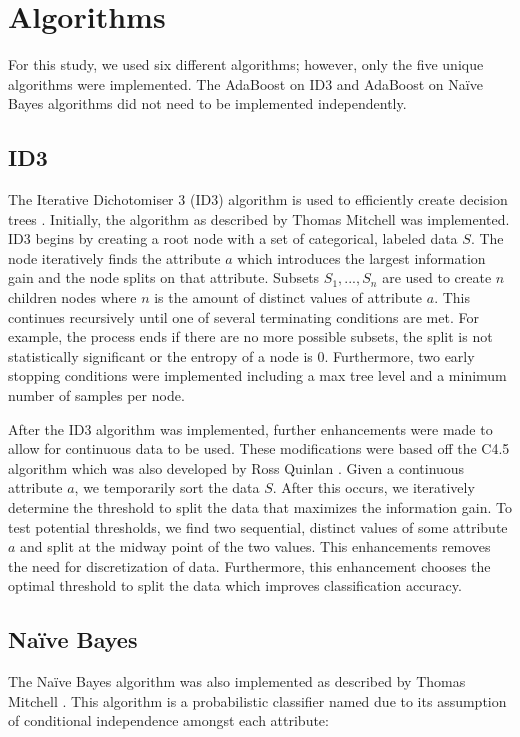 \documentclass[11pt,titlepage]{article}
\begin{document}
\section{Algorithms} \label{algorithms}
For this study, we used six different algorithms; however, only the five unique algorithms were implemented. The AdaBoost on ID3 and AdaBoost on Naïve Bayes algorithms did not need to be implemented independently.

\subsection{ID3}
The Iterative Dichotomiser 3 (ID3) algorithm is used to efficiently create decision trees \cite{Quinlan:1986:IDT:637962.637969}. Initially, the algorithm as described by Thomas Mitchell \cite{Mitchell:1997:ML:541177} was implemented. ID3 begins by creating a root node with a set of categorical, labeled data $S$. The node iteratively finds the attribute $a$ which introduces the largest information gain and the node splits on that attribute. Subsets ${S_1,...,S_n}$ are used to create $n$ children nodes where $n$ is the amount of distinct values of attribute $a$. This continues recursively until one of several terminating conditions are met. For example, the process ends if there are no more possible subsets, the split is not statistically significant or the entropy of a node is $0$. Furthermore, two early stopping conditions were implemented including a max tree level and a minimum number of samples per node.

After the ID3 algorithm was implemented, further enhancements were made to allow for continuous data to be used. These modifications were based off the C4.5 algorithm which was also developed by Ross Quinlan \citep{c45algorithm}. Given a continuous attribute $a$, we temporarily sort the data $S$. After this occurs, we iteratively determine the threshold to split the data that maximizes the information gain. To test potential thresholds, we find two sequential, distinct values of some attribute $a$ and split at the midway point of the two values. This enhancements removes the need for discretization of data. Furthermore, this enhancement chooses the optimal threshold to split the data which improves classification accuracy.

\subsection{Naïve Bayes}
The Naïve Bayes algorithm was also implemented as described by Thomas Mitchell \cite{Mitchell:1997:ML:541177}. This algorithm is a probabilistic classifier named due to its assumption of conditional independence amongst each attribute:
\end{document}
